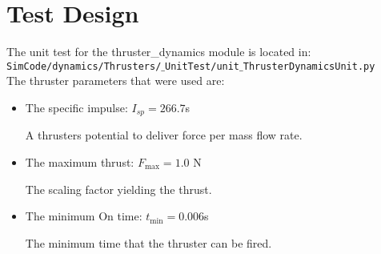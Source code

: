 \documentclass[]{BasiliskReportMemo}
\begin{document}
\section{Test Design}
The unit test for the thruster\_dynamics module is located in:\\

\noindent
{\tt SimCode/dynamics/Thrusters/$\_$UnitTest/unit$\_$ThrusterDynamicsUnit.py} \\

The thruster parameters that were used are:

\begin{itemize}
\item The specific impulse: $I_{sp} = 266.7$s 

A thrusters potential to deliver force per mass flow rate. 
\item The maximum thrust: $F_{\mathrm{max}} = 1.0$ N

The scaling factor yielding the thrust.
\item The minimum On time: $t_{\mathrm{min}} = 0.006$s

The minimum time that the thruster can be fired.
\end{itemize}
\end{document}
